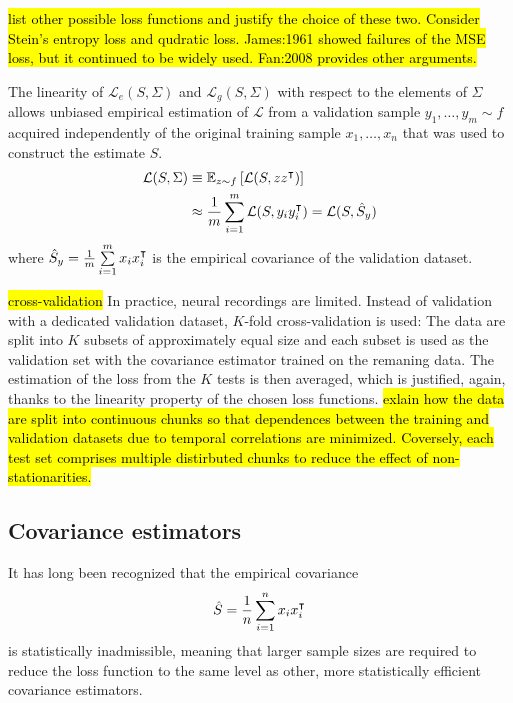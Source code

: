 \hl{\tiny list other possible loss functions and justify the choice of these two. Consider Stein's entropy loss and qudratic loss.   James:1961 showed failures of the MSE loss, but it continued to be widely used. Fan:2008 provides other arguments.}


The linearity of $\mathcal L_e(S,\Sigma)$ and $\mathcal L_g(S,\Sigma)$ with respect to the elements of $\Sigma$ allows unbiased empirical estimation of $\mathcal L$ from a validation sample $y_1,\ldots,y_m \sim f$ acquired independently of the original training sample $x_1,\ldots,x_n$ that was used to construct the estimate $S$.
\begin{equation}
\begin{split}
\mathcal L(S,\Sigma) & \equiv \mathbb E_{z\sim f} \left[ \mathcal L(S,zz^\intercal) \right] \\ 
&\approx \frac 1 m \sum\limits_{i=1}^m \mathcal L(S,y_i y_i^\intercal) = \mathcal L(S,\hat S_y)
\end{split}
\end{equation}
where $\hat S_y = \frac 1 m \sum\limits_{i=1}^m x_i x_i^\intercal$ is the empirical covariance of the validation dataset. 

\hl{\tiny cross-validation}
In practice, neural recordings are limited.   Instead of validation with a dedicated validation dataset, $K$-fold cross-validation is used: The data are split into $K$ subsets of approximately equal size and each subset is used as the validation set with the covariance estimator trained on the remaning data.  The estimation of the loss from the $K$ tests is then averaged, which is justified, again, thanks to the linearity property of the chosen loss functions. 
\hl{\tiny exlain how the data are split into continuous chunks so that dependences between the training and validation datasets due to temporal correlations are minimized.  Coversely, each test set comprises multiple distirbuted chunks to reduce the effect of non-stationarities.}
 
\subsection*{Covariance estimators}
It has long been recognized that the empirical covariance 
\begin{equation}
\hat S = \frac 1 n \sum\limits_{i=1}^n x_i x_i^\intercal
\end{equation}
is statistically inadmissible, meaning that larger sample sizes are required to reduce the loss function to the same level as other, more statistically efficient covariance estimators.

